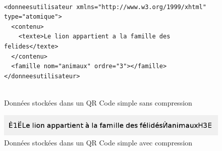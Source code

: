 \begin{figure}[!h]
\begin{adjustbox}{minipage=\textwidth,bgcolor={RGB}{240 240 240}}

\lstset{language=XML}

\begin{lstlisting}

<donneesutilisateur xmlns="http://www.w3.org/1999/xhtml" type="atomique">
  <contenu>
    <texte>Le lion appartient a la famille des felides</texte>
  </contenu>
  <famille nom="animaux" ordre="3"></famille>
</donneesutilisateur>
 
\end{lstlisting}

\end{adjustbox}
\caption{Données stockées dans un QR Code simple sans compression}

\end{figure}\textbf{}


\begin{figure}[]
	\centering
   \includegraphics[scale=0.6]{img/compression.png}
   \caption{Données stockées dans un QR Code simple avec compression}
\end{figure}